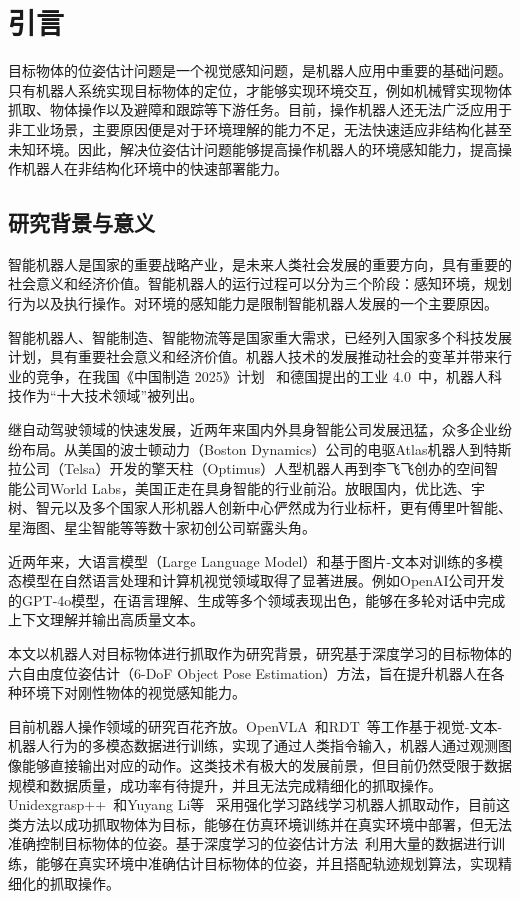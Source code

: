 \chapter{引言}
\par 目标物体的位姿估计问题是一个视觉感知问题，是机器人应用中重要的基础问题。只有机器人系统实现目标物体的定位，才能够实现环境交互，例如机械臂实现物体抓取、物体操作以及避障和跟踪等下游任务。目前，操作机器人还无法广泛应用于非工业场景，主要原因便是对于环境理解的能力不足，无法快速适应非结构化甚至未知环境。因此，解决位姿估计问题能够提高操作机器人的环境感知能力，提高操作机器人在非结构化环境中的快速部署能力。
\section{研究背景与意义}
\par 智能机器人是国家的重要战略产业，是未来人类社会发展的重要方向，具有重要的社会意义和经济价值。智能机器人的运行过程可以分为三个阶段：感知环境，规划行为以及执行操作。对环境的感知能力是限制智能机器人发展的一个主要原因。
\par 智能机器人、智能制造、智能物流等是国家重大需求，已经列入国家多个科技发展计划，具有重要社会意义和经济价值。机器人技术的发展推动社会的变革并带来行业的竞争，在我国《中国制造 2025》计划~\cite{中国制造2025} 和德国提出的工业 4.0~\cite{德国工业4.0}中，机器人科技作为“十大技术领域”被列出。
\par 继自动驾驶领域的快速发展，近两年来国内外具身智能公司发展迅猛，众多企业纷纷布局。从美国的波士顿动力（Boston Dynamics）公司的电驱Atlas机器人到特斯拉公司（Telsa）开发的擎天柱（Optimus）人型机器人再到李飞飞创办的空间智能公司World Labs，美国正走在具身智能的行业前沿。放眼国内，优比选、宇树、智元以及多个国家人形机器人创新中心俨然成为行业标杆，更有傅里叶智能、星海图、星尘智能等等数十家初创公司崭露头角。
\par 近两年来，大语言模型（Large Language Model）和基于图片-文本对训练的多模态模型在自然语言处理和计算机视觉领域取得了显著进展。例如OpenAI公司开发的GPT-4o模型，在语言理解、生成等多个领域表现出色，能够在多轮对话中完成上下文理解并输出高质量文本。
\par 本文以机器人对目标物体进行抓取作为研究背景，研究基于深度学习的目标物体的六自由度位姿估计（6-DoF Object Pose Estimation）方法，旨在提升机器人在各种环境下对刚性物体的视觉感知能力。
\par 目前机器人操作领域的研究百花齐放。OpenVLA~\cite{openvla}和RDT~\cite{liu2024rdt}等工作基于视觉-文本-机器人行为的多模态数据进行训练，实现了通过人类指令输入，机器人通过观测图像能够直接输出对应的动作。这类技术有极大的发展前景，但目前仍然受限于数据规模和数据质量，成功率有待提升，并且无法完成精细化的抓取操作。Unidexgrasp++~\cite{wan2023unidexgrasp++}和Yuyang Li等~\cite{li2024grasp} 采用强化学习路线学习机器人抓取动作，目前这类方法以成功抓取物体为目标，能够在仿真环境训练并在真实环境中部署，但无法准确控制目标物体的位姿。基于深度学习的位姿估计方法~\cite{hodan2024bop}利用大量的数据进行训练，能够在真实环境中准确估计目标物体的位姿，并且搭配轨迹规划算法，实现精细化的抓取操作。
